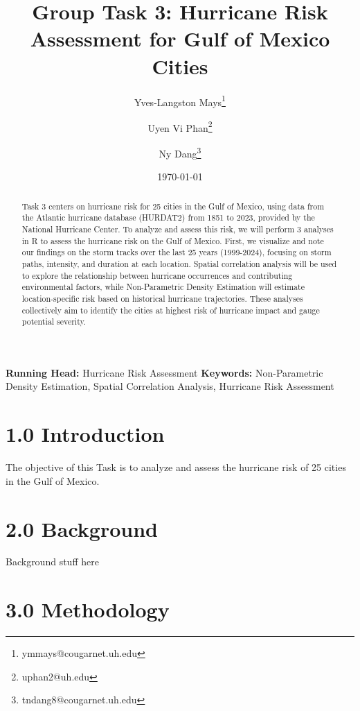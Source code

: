 \documentclass[12pt,letterpaper]{article}
\begin{document}
\title{Group Task 3: Hurricane Risk Assessment for Gulf of Mexico Cities}
\author[1]{Yves-Langston Mays\thanks{ymmays@cougarnet.uh.edu}}
\author[1]{Uyen Vi Phan\thanks{uphan2@uh.edu}}
\author[1]{Ny Dang\thanks{tndang8@cougarnet.uh.edu}}
\date{\today}
\maketitle
{\small\textbf{Running Head:} Hurricane Risk Assessment}
\vspace{0.5cm}
{\small\textbf{Keywords:} Non-Parametric Density Estimation, Spatial Correlation Analysis, Hurricane Risk Assessment}
\newpage
\begin{abstract}
Task 3 centers on hurricane risk for 25 cities in the Gulf of Mexico, using data from the Atlantic hurricane database (HURDAT2) from 1851 to 2023, provided by the National Hurricane Center. To analyze and assess this risk, we will perform 3 analyses in R to assess the hurricane risk on the Gulf of Mexico. First, we visualize and note our findings on the storm tracks over the last 25 years (1999-2024), focusing on storm paths, intensity, and duration at each location. Spatial correlation analysis will be used to explore the relationship between hurricane occurrences and contributing environmental factors, while Non-Parametric Density Estimation will estimate location-specific risk based on historical hurricane trajectories. These analyses collectively aim to identify the cities at highest risk of hurricane impact and gauge potential severity.
\end{abstract}
\newpage

\section{1.0 Introduction}\label{introduction}

The objective of this Task is to analyze and assess the hurricane risk
of 25 cities in the Gulf of Mexico.

\section{2.0 Background}\label{background}

Background stuff here

\section{3.0 Methodology}\label{methodology}
\end{document}
